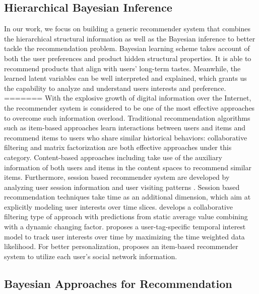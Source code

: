 \subsection{Hierarchical Bayesian Inference}
In our work, we focus on building a generic recommender system that combines the hierarchical structural information as well as the Bayesian inference to better tackle the recommendation problem.  Bayesian learning scheme takes account of both the user preferences and product hidden structural properties. It is able to recommend products that align with users' long-term tastes. Meanwhile, the learned latent variables can be well interpreted and explained, which grants us the capability to analyze and understand users interests and preference.
=======
With the explosive growth of digital information over the Internet, the recommender system is considered to be one of the most effective approaches to overcome such information overload. Traditional recommendation algorithms such as item-based approaches learn interactions between users and items and recommend items to users who share similar historical behaviors: collaborative filtering \cite{Sarwar:2001:ICF:371920.372071,Su:2009:SCF:1592474.1722966} and matrix factorization \cite{Rendle:2010:FPM} are both effective approaches under this category.  Content-based approaches including \cite{2011rsh..book...73L,Liu:2011,Yuan:2015} take use of the auxiliary information of both users and items in the content spaces to recommend similar items.  Furthermore, session based recommender system are developed by analyzing user session information and user visiting patterns \cite{Gultekin_acollaborative,Tang_review:2013}. Session based recommendation techniques take time as an additional dimension, which aim at explicitly modeling user interests over time slices. \cite{Koren:2010} develops a collaborative filtering type of approach with predictions from static average value combining with a dynamic changing factor. \cite{Yin:2011} proposes a user-tag-specific temporal interest model to track user interests over time by maximizing the time weighted data likelihood.  For better personalization, \cite{Guy:2009} proposes an item-based recommender system to utilize each user's social network information. 

\subsection{Bayesian Approaches for Recommendation}

